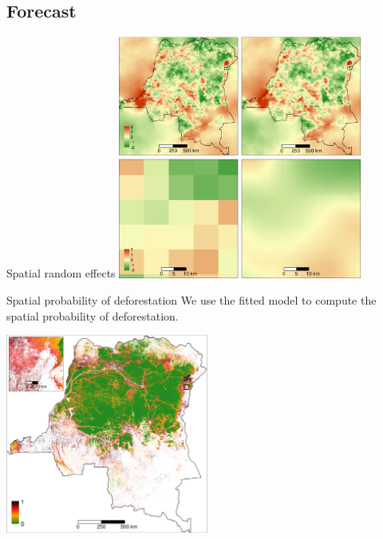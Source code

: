\documentclass[10pt,table,dvipsnames,compress]{beamer}
\begin{document}
\subsection{Forecast}
\label{sec:org72e7afe}
\begin{frame}[label={sec:orgdcd5316}]{Spatial random effects}
\centering \includegraphics[width=0.6\textwidth]{figs/sm/rho.png}

\end{frame}

\begin{frame}[label={sec:org504fc2c}]{Spatial probability of deforestation}
We use the fitted model to compute the spatial probability of
deforestation.

\centering \includegraphics[width=0.5\textwidth]{figs/sm/prob.png}

\end{frame}
\end{document}
